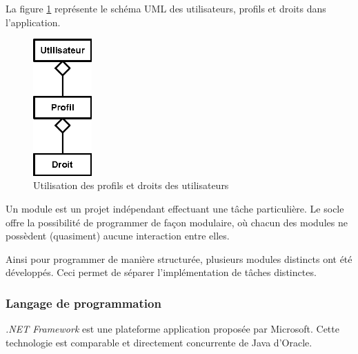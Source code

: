 La figure \ref{utilisateur_profils_droits} représente le schéma UML des utilisateurs, profils et droits dans l'application.
\begin{figure}[!h]
	\center
	\includegraphics[width=0.2\textwidth]{img/utilisateur_profils_droits.png}
	\caption{Utilisation des profils et droits des utilisateurs}
	\label{utilisateur_profils_droits}
\end{figure}



Un module est un projet indépendant effectuant une tâche particulière.
Le socle offre la possibilité de programmer de façon modulaire, où chacun des modules ne possèdent (quasiment) aucune interaction entre elles.

Ainsi pour programmer de manière structurée, plusieurs modules distincts ont été développés.
Ceci permet de séparer l'implémentation de tâches distinctes.


\subsubsection{Langage de programmation}


\textit{.NET Framework} est une plateforme application proposée par Microsoft.
Cette technologie est comparable et directement concurrente de Java d'Oracle.

